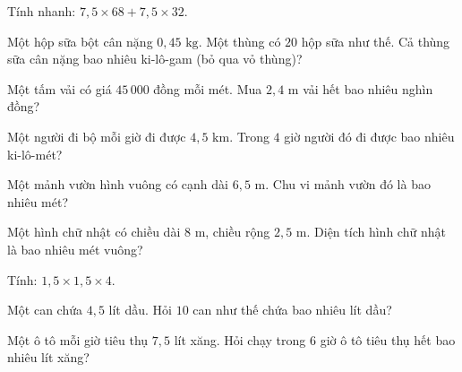 \begin{ex}
  Tính nhanh: $7{,}5 \times 68 + 7{,}5 \times 32$.
\end{ex}

\begin{ex}
  Một hộp sữa bột cân nặng $0{,}45\text{ kg}$. Một thùng có $20$ hộp sữa như thế. Cả thùng sữa cân nặng bao nhiêu ki-lô-gam (bỏ qua vỏ thùng)?
\end{ex}

\begin{ex}
  Một tấm vải có giá $45\,000$ đồng mỗi mét. Mua $2{,}4\text{ m}$ vải hết bao nhiêu nghìn đồng?
\end{ex}

\begin{ex}
  Một người đi bộ mỗi giờ đi được $4{,}5\text{ km}$. Trong $4$ giờ người đó đi được bao nhiêu ki-lô-mét?
\end{ex}

\begin{ex}
  Một mảnh vườn hình vuông có cạnh dài $6{,}5\text{ m}$. Chu vi mảnh vườn đó là bao nhiêu mét?
\end{ex}

\begin{ex}
  Một hình chữ nhật có chiều dài $8\text{ m}$, chiều rộng $2{,}5\text{ m}$. Diện tích hình chữ nhật là bao nhiêu mét vuông?
\end{ex}

\begin{ex}
  Tính: $1{,}5 \times 1{,}5 \times 4$.
\end{ex}

\begin{ex}
  Một can chứa $4{,}5$ lít dầu. Hỏi $10$ can như thế chứa bao nhiêu lít dầu?
\end{ex}

\begin{ex}
  Một ô tô mỗi giờ tiêu thụ $7{,}5$ lít xăng. Hỏi chạy trong $6$ giờ ô tô tiêu thụ hết bao nhiêu lít xăng?
\end{ex}

